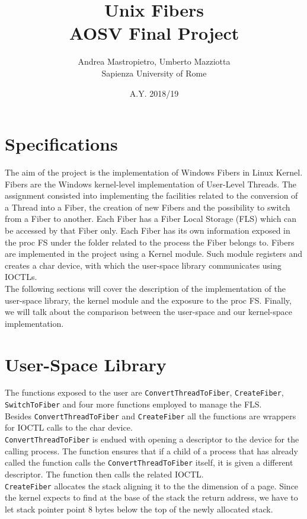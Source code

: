 \documentclass[11pt]{article}
\title{Unix Fibers\\AOSV Final Project}
\author{Andrea Mastropietro, Umberto Mazziotta\\Sapienza University of Rome}
\date{A.Y. 2018/19}
\begin{document}
\maketitle

\section{Specifications}
The aim of the project is the implementation of Windows Fibers in Linux Kernel. Fibers are the Windows kernel-level implementation of User-Level Threads. The assignment consisted into implementing the facilities related to the conversion of a Thread into a Fiber, the creation of new Fibers and the possibility to switch from a Fiber to another. Each Fiber has a Fiber Local Storage (FLS) which can be accessed by that Fiber only. Each Fiber has its own information exposed in the proc FS under the folder related to the process the Fiber belongs to. Fibers are implemented in the project using a Kernel module. Such module registers and creates a char device, with which the user-space library communicates using IOCTLs.\\
The following sections will cover the description of the implementation of the user-space library, the kernel module and the exposure to the proc FS. Finally, we will talk about the comparison between the user-space and our kernel-space implementation.

\section{User-Space Library}
The functions exposed to the user are \texttt{ConvertThreadToFiber}, \texttt{CreateFiber}, \texttt{SwitchToFiber} and four more functions employed to manage the FLS.\\
Besides \texttt{ConvertThreadToFiber} and \texttt{CreateFiber} all the functions are wrappers for IOCTL calls to the char device.\\
\texttt{ConvertThreadToFiber} is endued with opening a descriptor to the device for the calling process. The function ensures that if a child of a process that has already called the function calls the \texttt{ConvertThreadToFiber} itself, it is given a different descriptor. The function then calls the related IOCTL.\\
\texttt{CreateFiber} allocates the stack aligning it to the the dimension of a page. Since the kernel expects to find at the base of the stack the return address, we have to let stack pointer point 8 bytes below the top of the newly allocated stack.
\end{document}
